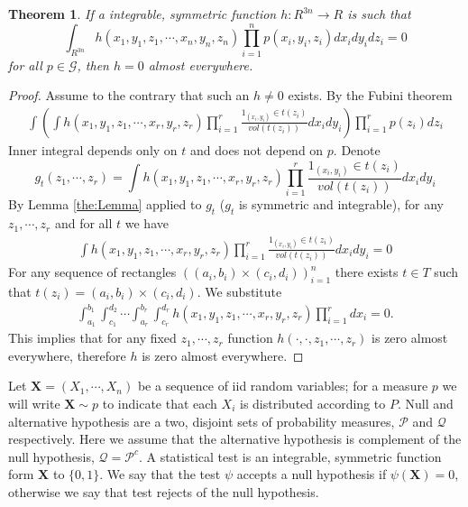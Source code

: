 \documentclass{article}
\newtheorem{Theorem}{Theorem}
\begin{document}
\begin{Theorem}
\label{th:1}
If a integrable, symmetric function $h : R^{3n} \to R$ is such that 
\[
 \int_{R^{3n}} h(x_1,y_1,z_1,\cdots,x_n,y_n,z_n) \prod_{i=1}^n p(x_i,y_i,z_i) d x_i d y_i d z_i = 0
\]
for all $p \in \mathcal G$, then $h=0$ almost everywhere.
\end{Theorem}

\begin{proof}
Assume to the contrary that such an $h \neq 0 $ exists. By the Fubini theorem  
\begin{align}
\int  \left( \int h(x_1,y_1,z_1,\cdots, x_r,y_r,z_r) \prod_{i=1}^r \frac{ 1_{ (x_i,y_i) } \in t(z_i) }{ vol(t(z_i)) }   d x_i d y_i \right) \prod_{i=1}^r  p(z_i)  d z_i
\end{align}
Inner integral depends only on $t$ and does not depend on $p$. Denote 
\[
g_{t}( z_1,\cdots,z_r)  = \int h(x_1,y_1,z_1,\cdots, x_r,y_r,z_r) \prod_{i=1}^r \frac{ 1_{ (x_i,y_i) } \in t(z_i) }{ vol(t(z_i)) }    d x_i d y_i
\]
 By Lemma \ref{the:Lemma} applied to $g_t$ ($g_{t}$ is symmetric and integrable), for any $z_1, \cdots , z_r$ and for all $t$ we have
\begin{align}
 \int h(x_1,y_1,z_1,\cdots, x_r,y_r,z_r) \prod_{i=1}^r \frac{ 1_{ (x_i,y_i) } \in t(z_i) }{ vol(t(z_i)) }    d x_i d y_i =  0
\end{align}
For any  sequence of rectangles  $( (a_i,b_i) \times (c_i,d_i) )_{i=1}^{n}$ there exists $t \in T$ such that  $t(z_i) = (a_i,b_i) \times (c_i,d_i)$. We substitute
\begin{align}
\int_{a_1}^{b_1} \int_{c_1}^{d_2} \cdots \int_{a_r}^{b_r} \int_{c_r}^{d_r} h(x_1,y_1,z_1, \cdots, x_r,y_r,z_r) \prod_{i=1}^{r}  dx_i = 0. 
\end{align}
This implies that for any fixed  $z_1, \cdots , z_r$ function  $h(\cdot,\cdot,z_1, \cdots ,z_r)$ is zero almost everywhere, therefore  $h$ is zero almost everywhere.
\end{proof}







Let   $\mathbf X = (X_1,\cdots, X_n)$ be a sequence of iid random variables; for a measure $p$ we will write $\mathbf X \sim p$ to indicate that each $X_i$ is distributed according to  $P$.  Null and alternative hypothesis are a two, disjoint sets of probability measures, $\mathcal{P}$ and $\mathcal{Q}$ respectively. Here we assume that the alternative hypothesis is complement of the null hypothesis,  $\mathcal Q = \mathcal{P}^c$.  A statistical test is an integrable, symmetric function form  $\mathbf X$ to $\{0,1\}$. We say that the test $\psi$ accepts a null hypothesis if $\psi(\mathbf X)=0$, otherwise we say that test rejects of the null hypothesis. 
\end{document}
